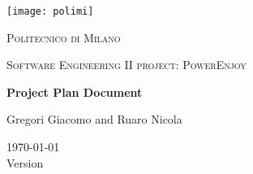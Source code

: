 \centering
\texttt{[image: polimi]}\\\vspace{0.25cm}
{\scshape\LARGE Politecnico di Milano\par}\vspace{0.25cm}
{\scshape\Large Software Engineering II project: PowerEnjoy\par}\vspace{1.5cm}
{\huge\bfseries Project Plan Document \par}\vspace{1cm}
{\large Gregori Giacomo and Ruaro Nicola\par}\vfill

{\large \today \\Version \version}
